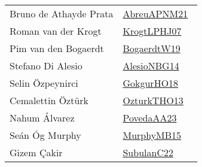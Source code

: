 {\begin{longtable}{p{4cm}p{20cm}}
Bruno de Athayde Prata & \href{}{AbreuAPNM21}~\cite{AbreuAPNM21}\\
Roman van der Krogt & \href{works/KrogtLPHJ07.pdf}{KrogtLPHJ07}~\cite{KrogtLPHJ07}\\
Pim van den Bogaerdt & \href{works/BogaerdtW19.pdf}{BogaerdtW19}~\cite{BogaerdtW19}\\
Stefano {Di Alesio} & \href{works/AlesioNBG14.pdf}{AlesioNBG14}~\cite{AlesioNBG14}\\
Selin {\"{O}}zpeynirci & \href{}{GokgurHO18}~\cite{GokgurHO18}\\
Cemalettin {\"{O}}zt{\"{u}}rk & \href{works/OzturkTHO13.pdf}{OzturkTHO13}~\cite{OzturkTHO13}\\
Nahum {\'{A}}lvarez & \href{works/PovedaAA23.pdf}{PovedaAA23}~\cite{PovedaAA23}\\
Se{\'{a}}n {\'{O}}g Murphy & \href{works/MurphyMB15.pdf}{MurphyMB15}~\cite{MurphyMB15}\\
Gizem {\c{C}}akir & \href{works/SubulanC22.pdf}{SubulanC22}~\cite{SubulanC22}\\
\end{longtable}
}

